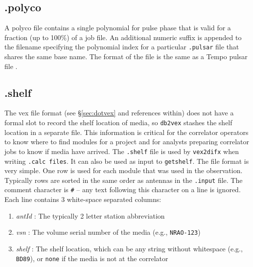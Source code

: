 
\subsection{.polyco} \label{sec:polycofile} 

A polyco file contains a single polynomial for pulse phase that is valid for a fraction (up to 100\%) of a job file.
An additional numeric suffix is appended to the filename specifying the polynomial index for a particular {\tt .pulsar} file that shares the same base name.
The format of the file is the same as a Tempo pulsar file \cite{tempo}.









\subsection{.shelf} \label{sec:shelf}

The vex file format (see \S\ref{sec:dotvex} and references within) does not have a formal slot to record the shelf location of media, so {\tt db2vex} stashes the shelf location in a separate file.
This information is critical for the correlator operators to know where to find modules for a project and for analysts preparing correlator jobs to know if media have arrived.
The {\tt .shelf} file is used by {\tt vex2difx} when writing {\tt .calc files}.
It can also be used as input to {\tt getshelf}.
The file format is very simple.
One row is used for each module that was used in the observation.
Typically rows are sorted in the same order as antennas in the {\tt .input} file.
The comment character is {\tt \#} -- any text following this character on a line is ignored.
Each line contains 3 white-space separated columns:
\begin{enumerate}
\item {\em antId} : The typically 2 letter station abbreviation
\item {\em vsn} : The volume serial number of the media (e.g., {\tt NRAO-123})
\item {\em shelf} : The shelf location, which can be any string without whitespace (e.g., {\tt BD89}), or {\tt none} if the media is not at the correlator 
\end{enumerate}







